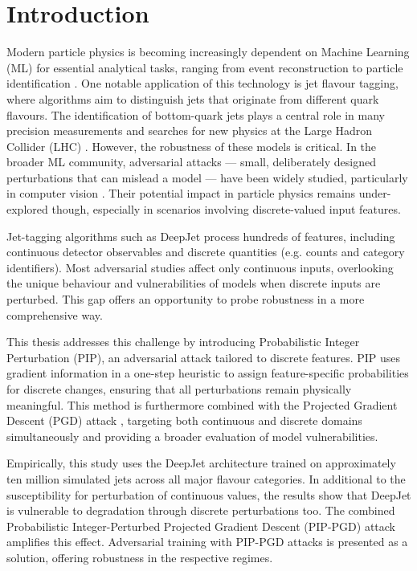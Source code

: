 \chapter{Introduction}

Modern particle physics is becoming increasingly dependent on Machine Learning (ML) for essential analytical tasks, ranging from event reconstruction to particle identification \cite{Stein2022}. One notable
application of this technology is jet flavour tagging, where algorithms aim to distinguish jets that originate
from different quark flavours. The identification of bottom-quark jets plays a central role in many precision measurements and searches for new physics at the Large Hadron Collider (LHC) \cite{PhysRevLett.121.121801}. However, the robustness of these models is critical. In the broader ML community, adversarial attacks — small, deliberately designed perturbations that can mislead a model — have been widely studied, particularly in computer vision \cite{goodfellow2015explainingharnessingadversarialexamples}. Their potential impact in particle physics remains under-explored though, especially in scenarios involving discrete-valued input features.

Jet-tagging algorithms such as DeepJet \cite{Bols_2020} process hundreds of features, including continuous detector observables and discrete quantities (e.g. counts and category identifiers). Most adversarial studies affect only continuous inputs, overlooking the unique behaviour and vulnerabilities of models when discrete inputs are perturbed. This gap offers an opportunity to probe robustness in a more comprehensive way.

This thesis addresses this challenge by introducing Probabilistic Integer Perturbation (PIP), an adversarial attack tailored to discrete features. PIP uses gradient information in a one-step heuristic to assign feature-specific probabilities for discrete changes, ensuring that all perturbations remain physically meaningful. This method is furthermore combined with the Projected Gradient Descent (PGD) attack \cite{madry2019deeplearningmodelsresistant}, targeting both continuous and discrete domains simultaneously and providing a broader evaluation of model vulnerabilities.

Empirically, this study uses the DeepJet architecture \cite{Bols_2020} trained on approximately ten million simulated jets across all major flavour categories. In additional to the susceptibility for perturbation of continuous values, the results show that DeepJet is vulnerable to degradation through discrete perturbations too. The combined Probabilistic Integer-Perturbed Projected Gradient Descent (PIP-PGD) attack amplifies this effect. Adversarial training with PIP-PGD attacks is presented as a solution, offering robustness in the respective regimes.

